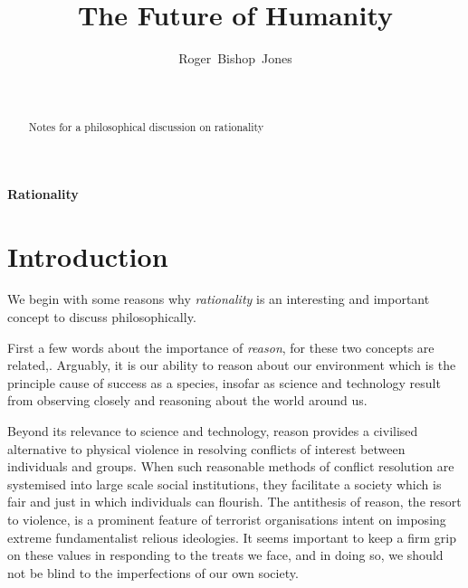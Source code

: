\documentclass[12pt,titlepage]{article}
\title{The Future of Humanity}
\author{Roger~Bishop~Jones}
\date{\ }
\begin{document}
                               
\begin{titlepage}
\maketitle

\begin{abstract}
Notes for a philosophical discussion on rationality
\end{abstract}





\end{titlepage}

\setcounter{tocdepth}{2}
{\parskip-0pt\tableofcontents}



\pagebreak

\begin{centering}
{\LARGE \bf Rationality}
\end{centering}

\section{Introduction}

We begin with some reasons why {\it rationality} is an interesting and important
concept to discuss philosophically.

First a few words about the importance of {\it reason}, for these two concepts are related,.
Arguably, it is our ability to reason about our environment which is the principle cause
of success as a species, insofar as science and technology result from observing closely
and reasoning about the world around us.

Beyond its relevance to science and technology, reason provides a civilised alternative
to physical violence in resolving conflicts of interest between individuals and groups.
When such reasonable methods of conflict resolution are systemised into large scale
social institutions, they facilitate a society which is fair and just in which individuals
can flourish.
The antithesis of reason, the resort to violence, is a prominent feature of terrorist
organisations intent on imposing extreme fundamentalist relious ideologies.
It seems important to keep a firm grip on these values in responding to the treats
we face, and in doing so, we should not be blind to the imperfections of our own
society.
\end{document}
